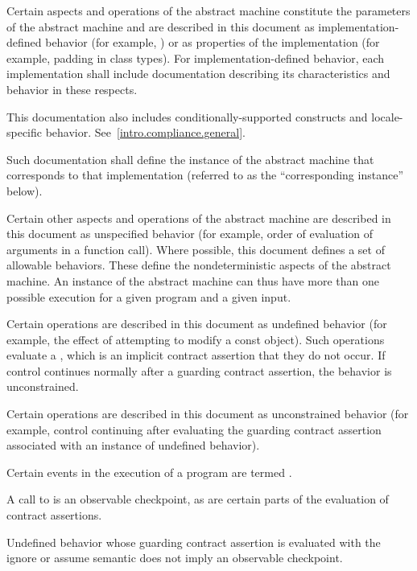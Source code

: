 \pnum
{}%
Certain aspects and operations of the abstract machine
constitute the parameters of the abstract machine and
are described in this
document as implementation-defined behavior (for example,
)
or as properties of the implementation (for example, padding in class types).
For implementation-defined behavior,
each implementation shall include documentation describing its characteristics
and behavior in these respects.
\begin{footnote}
This documentation also includes
conditionally-supported constructs and locale-specific behavior.
See~\ref{intro.compliance.general}.
\end{footnote}
Such documentation shall define the instance of the
abstract machine that corresponds to that implementation (referred to as the
``corresponding instance'' below).

\pnum
{}%
Certain other aspects and operations of the abstract machine are
described in this document as unspecified behavior (for example,
order of evaluation of arguments in a function call).
Where possible, this
document defines a set of allowable behaviors. These
define the nondeterministic aspects of the abstract machine. An instance
of the abstract machine can thus have more than one possible execution
for a given program and a given input.

\pnum
{}%
Certain operations are described in this document as
undefined behavior (for example, the effect of
attempting to modify a const object).
Such operations
evaluate a ,
which is an implicit contract assertion
that they do not occur.
If control continues normally
after a guarding contract assertion,
the behavior is unconstrained.

\pnum
{}%
Certain operations are described in this document as
unconstrained behavior (for example, control continuing
after evaluating the guarding contract assertion
associated with an instance of undefined behavior).

\pnum
Certain events in the execution of a program
are termed .
\begin{note}
A call to 
is an observable checkpoint,
as are certain parts of
the evaluation of contract assertions.
\end{note}
\begin{note}
Undefined behavior
whose guarding contract assertion
is evaluated with the ignore or assume semantic
does not imply an observable checkpoint.
\end{note}

